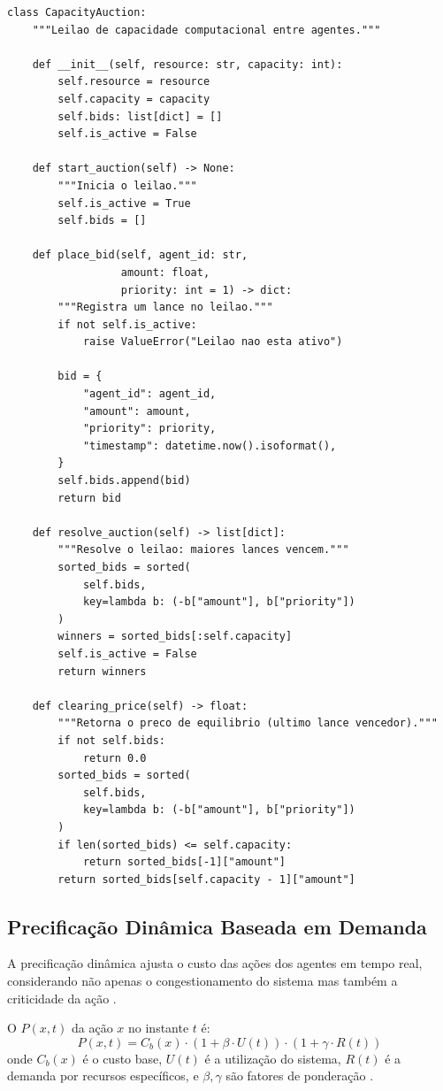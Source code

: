 \begin{lstlisting}[caption={Leilao de capacidade computacional},
                  label={lst:capacity-auction}]
class CapacityAuction:
    """Leilao de capacidade computacional entre agentes."""

    def __init__(self, resource: str, capacity: int):
        self.resource = resource
        self.capacity = capacity
        self.bids: list[dict] = []
        self.is_active = False

    def start_auction(self) -> None:
        """Inicia o leilao."""
        self.is_active = True
        self.bids = []

    def place_bid(self, agent_id: str,
                  amount: float,
                  priority: int = 1) -> dict:
        """Registra um lance no leilao."""
        if not self.is_active:
            raise ValueError("Leilao nao esta ativo")

        bid = {
            "agent_id": agent_id,
            "amount": amount,
            "priority": priority,
            "timestamp": datetime.now().isoformat(),
        }
        self.bids.append(bid)
        return bid

    def resolve_auction(self) -> list[dict]:
        """Resolve o leilao: maiores lances vencem."""
        sorted_bids = sorted(
            self.bids,
            key=lambda b: (-b["amount"], b["priority"])
        )
        winners = sorted_bids[:self.capacity]
        self.is_active = False
        return winners

    def clearing_price(self) -> float:
        """Retorna o preco de equilibrio (ultimo lance vencedor)."""
        if not self.bids:
            return 0.0
        sorted_bids = sorted(
            self.bids,
            key=lambda b: (-b["amount"], b["priority"])
        )
        if len(sorted_bids) <= self.capacity:
            return sorted_bids[-1]["amount"]
        return sorted_bids[self.capacity - 1]["amount"]
\end{lstlisting}

\subsection{Precificação Dinâmica Baseada em Demanda}

A precificação dinâmica ajusta o custo das ações dos agentes em
tempo real, considerando não apenas o congestionamento do sistema
mas também a criticidade da ação \cite{opencode2026token}.

\begin{definicao}
O  $P(x, t)$ da ação $x$ no instante $t$ é:
\[
P(x, t) = C_b(x) \cdot (1 + \beta \cdot U(t)) \cdot (1 + \gamma \cdot R(t))
\]
onde $C_b(x)$ é o custo base, $U(t)$ é a utilização do sistema,
$R(t)$ é a demanda por recursos específicos, e $\beta, \gamma$
são fatores de ponderação \cite{opencode2026token}.
\end{definicao}

